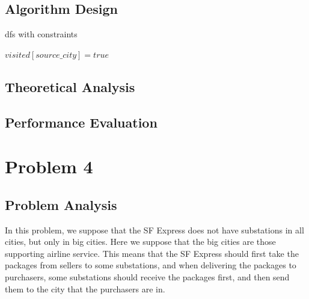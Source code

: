 \documentclass{llncs}
\begin{document}
\subsection{Algorithm Design}
\begin{algorithm}
  \BlankLine
  \caption{dfs with constraints}
  \label{Alg-dfs-with-constraints}
  
  \BlankLine 
  
  $visited[source\_city] = true$\;

\end{algorithm}
\subsection{Theoretical Analysis}
\subsection{Performance Evaluation}

\section{Problem 4}
\subsection{Problem Analysis}
In this problem, we suppose that the SF Express does not have substations in all cities, but only in big cities. Here we suppose that the big cities are those supporting airline service. 
This means that the SF Express should first take the packages from sellers to some substations, and when delivering the packages to purchasers, some substations should receive the packages first, and then send them to the city that the purchasers are in.
\end{document}
